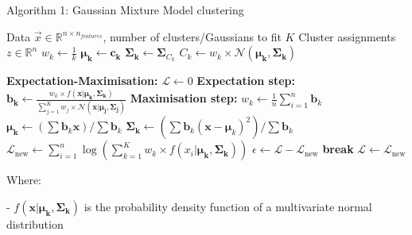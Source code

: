 \documentclass[12pt]{report} %
\begin{document}
\begin{definitionbox}{Algorithm 1: Gaussian Mixture Model clustering}
  \begin{algorithmic}[1]
    \State Data $\vec{x} \in \mathbb{R}^{n \times n_{features}}$, number of clusters/Gaussians to fit $K$ 
    \State Cluster assignments $z \in \mathbb{R}^n$ 
    \State $w_{k} \gets \frac{1}{k}$ 
    \State $\mathbf{\mu_{k}} \gets \mathbf{c_{k}}$ 
    \State $\mathbf{\Sigma_{k}} \gets \mathbf{\Sigma}_{C_{k}}$ 
    \State $C_{k} \gets w_{k} \times \mathcal{N}(\mathbf{\mu_{k}}, \mathbf{\Sigma_{k}})$ 

    \State \textbf{Expectation-Maximisation:}
    \State $\mathcal{L} \gets 0$ 
      \State \textbf{Expectation step:}
        \State $\mathbf{b_{k}} \gets \frac{w_{k} \times f(\mathbf{x}|\mathbf{\mu_{k}}, \mathbf{\Sigma_{k}})}{\sum_{j=1}^{K} w_{j} \times \mathcal{N}(\mathbf{x}|\mathbf{\mu_{j}}, \mathbf{\Sigma_{j}})}$ 
      \EndFor
      \State \textbf{Maximisation step:}
        \State $w_{k} \gets \frac{1}{n} \sum_{i=1}^{n} \mathbf{b}_{k}$ 
        \State $\mathbf{\mu_{k}} \gets (\sum \mathbf{b}_{k}\mathbf{x})/\sum \mathbf{b}_{k}$ 
        \State $\mathbf{\Sigma_{k}} \gets (\sum \mathbf{b}_{k}(\mathbf{x} - \mathbf{\mu}_{k})^{2})/\sum \mathbf{b}_{k}$ 
      \EndFor
      \State $\mathcal{L}_{\text{new}} \gets \sum_{i=1}^{n} \log(\sum_{k=1}^{K} w_{k} \times f(x_{i}|\mathbf{\mu_{k}}, \mathbf{\Sigma_{k}}))$ 
      \State $\epsilon \gets \mathcal{L} - \mathcal{L}_{\text{new}}$ 
        \State \textbf{break}
      \EndIf
      \State $\mathcal{L} \gets \mathcal{L}_{\text{new}}$ 
    \EndFor

  \end{algorithmic}
  Where:

  - $f(\mathbf{x}|\mathbf{\mu_{k}}, \mathbf{\Sigma_{k}})$ is the probability density function of a multivariate normal distribution

  \label{alg:GMM}
\end{definitionbox}
\end{document}
